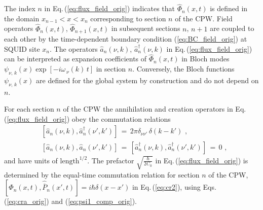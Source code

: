 %
The index $n$ in Eq.\,(\ref{eq:flux_field_orig}) indicates
that $\hat{\Phi}_n(x,t)$ is defined in the domain
$x_{n-1} < x < x_n$ corresponding to section $n$ of the CPW. Field operators $\hat{\Phi}_n(x,t)$,
$\hat{\Phi}_{n+1}(x,t)$ in subsequent sections $n$, $n+1$ are coupled to each other
by the time-dependent 
boundary condition (\ref{eq:BC_field_orig}) at SQUID site $x_n$.
The operators $\hat{a}_n(\nu,k)$, $\hat{a}_n^{\dagger}(\nu,k)$ in Eq.\,(\ref{eq:flux_field_orig})
can be interpreted as expansion coefficients of 
$\hat{\Phi}_n(x,t)$ in Bloch modes $\psi_{\nu,\,k}(x) \exp\left[-i \omega_{\,\nu}(k) \, t \right]$ in section $n$.
Conversely, the Bloch functions $\psi_{\nu,\,k}(x)$ are defined for the global system by construction 
and do not depend on $n$.

For each section $n$ of the CPW the annihilation and creation operators in 
Eq.\,(\ref{eq:flux_field_orig}) obey the commutation relations
%
\begin{equation} \label{eq:cra_orig}
\begin{split}
    & \left[ \hat{a}_n(\nu,k),{\hat a}_n^\dagger(\nu',k') \right] \, = \, 
    2 \pi \delta_{\nu \nu'} \, \delta(k - k') \, \, , \\[2mm]
    & \left[ \hat{a}_n(\nu,k),{\hat a}_n(\nu',k') \right] \, = \, 
    \left[ \hat{a}_n^\dagger(\nu,k),{\hat a}_n^\dagger(\nu',k') \right] \, = \, 0 \, \, ,
\end{split}
\end{equation}
%
and have units of $\text{length}^{1/2}$.
The prefactor $\displaystyle{\sqrt{\frac{\hbar}{2 C_0}}}$ in Eq.\,(\ref{eq:flux_field_orig}) 
is determined by the equal-time commutation relation for section $n$ of the CPW,
$\left[\hat{\Phi}_n(x,t), \hat{\overline{P}}_n(x',t) \right] = i \hbar \delta(x - x')$ 
in Eq.\,(\ref{eq:cr2}), using Eqs.\,(\ref{eq:cra_orig}) and (\ref{eq:psi1_comp_orig}).

